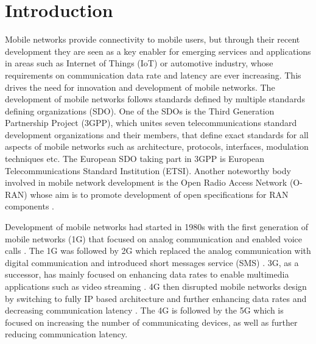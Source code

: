 \documentclass[12pt,a4paper,twoside]{report}
\begin{document}
\tableofcontents			

\glsaddallunused
\printglossary[type=\acronymtype,title={List of Abbreviations}]	%



\newpage

\setcounter{page}{1}

\chapter{Introduction}
Mobile networks provide connectivity to mobile users, but through their recent development they are seen as a key enabler for emerging services and applications in areas such as Internet of Things (IoT) or automotive industry, whose requirements on communication data rate and latency are ever increasing. This drives the need for innovation and development of mobile networks. The development of mobile networks follows standards defined by multiple standards defining organizations (SDO). One of the SDOs is the Third Generation Partnership Project (3GPP), which unites seven telecommunications standard development organizations and their members, that define exact standards for all aspects of mobile networks such as architecture, protocols, interfaces, modulation techniques etc. The European SDO taking part in 3GPP is European Telecommunications Standard Institution (ETSI). Another noteworthy body involved in mobile network development is the Open Radio Access Network (O-RAN) whose aim is to promote development of open specifications for RAN components \cite{o-ran-web}. 

Development of mobile networks had started in 1980s with the first generation of mobile networks (1G) that focused on analog communication and enabled voice calls \cite{sauter2017history}. The 1G was followed by 2G which replaced the analog communication with digital communication and introduced short messages service (SMS) \cite{sauter2017history}. 3G, as a successor, has mainly focused on enhancing data rates to enable multimedia applications such as video streaming \cite{sauter2017history}. 4G then disrupted mobile networks design by switching to fully IP based architecture and further enhancing data rates and decreasing communication latency \cite{sauter2017history,dahlman-2013-4g}. The 4G is followed by the 5G which is focused on increasing the number of communicating devices, as well as further reducing communication latency. 
\end{document}
